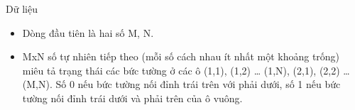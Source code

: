 Dữ liệu
\begin{itemize}
	\item Dòng đầu tiên là hai số M, N.
	\item MxN số tự nhiên tiếp theo (mỗi số cách nhau ít nhất một khoảng trống) miêu tả trạng thái các bức tường ở các ô (1,1), (1,2) … (1,N), (2,1), (2,2) … (M,N). Số 0 nếu bức tường nối đỉnh trái trên với phải dưới, số 1 nếu bức tường nối đỉnh trái dưới và phải trên của ô vuông.
\end{itemize}